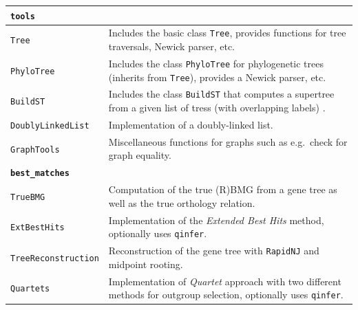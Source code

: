 \documentclass[hidelinks,11pt]{article}
\begin{document}
{\begin{longtable}{| p{4.0cm} | p{10cm} |}
	\multicolumn{2}{|l|}{\textbf{\texttt{tools}}}\\
	\hline
	\texttt{Tree} & 
	Includes the basic class \texttt{Tree}, provides functions for tree traversals, Newick parser, etc. \\
	\texttt{PhyloTree} & 
	Includes the class \texttt{PhyloTree} for phylogenetic trees (inherits from \texttt{Tree}), provides a Newick parser, etc. \\
	\texttt{BuildST} & 
	Includes the class \texttt{BuildST} that computes a supertree from a given list of tress (with overlapping labels) \citep{deng2016}. \\
	\texttt{DoublyLinkedList} & 
	Implementation of a doubly-linked list. \\
	\texttt{GraphTools} & 
	Miscellaneous functions for graphs such as e.g.\ check for graph equality. \\
	\hline
	\multicolumn{2}{|l|}{\textbf{\texttt{best\_matches}}}\\
	\hline
	\texttt{TrueBMG} & 
	Computation of the true (R)BMG from a gene tree as well as the true orthology relation. \\
	\texttt{ExtBestHits} & 
	Implementation of the \emph{Extended Best Hits} method, optionally uses \texttt{qinfer}. \\
	\texttt{TreeReconstruction} & 
	Reconstruction of the gene tree with \texttt{RapidNJ} \citep{simonsen2008} and midpoint rooting. \\
	\texttt{Quartets} & 
	Implementation of \emph{Quartet} approach with two different methods for outgroup selection, optionally uses \texttt{qinfer}. \\

\end{longtable}}
\end{document}
